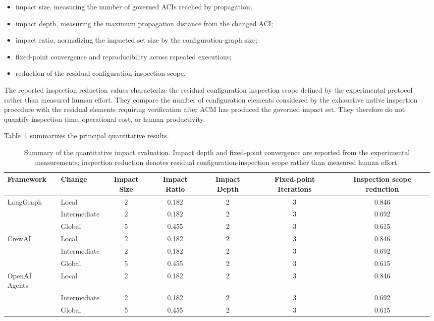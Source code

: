 \documentclass[10pt]{article}
\begin{document}
\begin{itemize} 
	\item impact size, measuring the number of governed ACIs reached by propagation; 
	\item impact depth, measuring the maximum propagation distance from the changed ACI; 
	\item impact ratio, normalizing the impacted set size by the configuration-graph size; 
	\item fixed-point convergence and reproducibility across repeated executions; 
	\item reduction of the residual configuration inspection scope. \end{itemize}

The reported inspection reduction values characterize the residual configuration inspection scope defined by the experimental protocol rather than measured human effort. They compare the number of configuration elements considered by the exhaustive native inspection procedure with the residual elements requiring verification after ACM has produced the governed impact set. They therefore do not quantify inspection time, operational cost, or human productivity.

Table~\ref{tab:impact_summary} summarizes the principal quantitative results.

\begin{table}[t]
	\centering
	\caption{Summary of the quantitative impact evaluation. Impact depth and fixed-point convergence are reported from the experimental measurements; inspection reduction denotes residual configuration-inspection scope rather than measured human effort.}
	\label{tab:impact_summary}
	\small
	\begin{tabular}{llccccc}
		\toprule
		Framework &
		Change &
		Impact Size &
		Impact Ratio &
		Impact Depth &
		Fixed-point Iterations &
		Inspection scope reduction
		\\
		\midrule
		LangGraph &
		Local &
		2 &
		0.182 &
		2 &
		3 &
		0.846
		\\
		&
		Intermediate &
		2 &
		0.182 &
		2 &
		3 &
		0.692
		\\
		&
		Global &
		5 &
		0.455 &
		2 &
		3 &
		0.615
		\\
		\midrule
		CrewAI &
		Local &
		2 &
		0.182 &
		2 &
		3 &
		0.846
		\\
		&
		Intermediate &
		2 &
		0.182 &
		2 &
		3 &
		0.692
		\\
		&
		Global &
		5 &
		0.455 &
		2 &
		3 &
		0.615
		\\
		\midrule
		OpenAI Agents &
		Local &
		2 &
		0.182 &
		2 &
		3 &
		0.846
		\\
		&
		Intermediate &
		2 &
		0.182 &
		2 &
		3 &
		0.692
		\\
		&
		Global &
		5 &
		0.455 &
		2 &
		3 &
		0.615
		\\
		\bottomrule
	\end{tabular}
\end{table}
\end{document}
